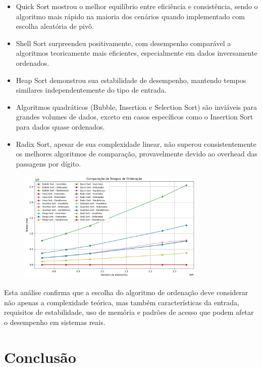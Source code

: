 \documentclass[a4paper, 12pt]{article}
\begin{document}
            \begin{itemize}
                \item Quick Sort mostrou o melhor equilíbrio entre eficiência e consistência, sendo o algoritmo mais rápido na maioria dos cenários quando implementado com escolha aleatória de pivô.
                \item Shell Sort surpreendeu positivamente, com desempenho comparável a algoritmos teoricamente mais eficientes, especialmente em dados inversamente ordenados.
                \item Heap Sort demonstrou sua estabilidade de desempenho, mantendo tempos similares independentemente do tipo de entrada.
                \item Algoritmos quadráticos (Bubble, Insertion e Selection Sort) são inviáveis para grandes volumes de dados, exceto em casos específicos como o Insertion Sort para dados quase ordenados.
                \item Radix Sort, apesar de sua complexidade linear, não superou consistentemente os melhores algoritmos de comparação, provavelmente devido ao overhead das passagens por dígito.
            \end{itemize}

            \begin{figure}[ht]
                \centering
                \includegraphics[width=0.8\textwidth]{images/tudoqueda.png}
            \end{figure}


        Esta análise confirma que a escolha do algoritmo de ordenação deve considerar não apenas a complexidade teórica, mas também características da entrada, requisitos de estabilidade, uso de memória e padrões de acesso que podem afetar o desempenho em sistemas reais.

    \section{Conclusão}
\end{document}
